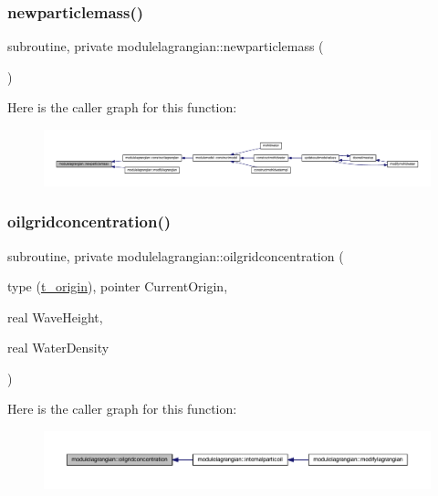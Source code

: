 \subsubsection{\texorpdfstring{newparticlemass()}{newparticlemass()}}
{\footnotesize\ttfamily subroutine, private modulelagrangian\+::newparticlemass (\begin{DoxyParamCaption}{ }\end{DoxyParamCaption})\hspace{0.3cm}{\ttfamily [private]}}

Here is the caller graph for this function\+:\nopagebreak
\begin{figure}[H]
\begin{center}
\leavevmode
\includegraphics[width=350pt]{namespacemodulelagrangian_a5afe5f1c46e068854f5c2eca0de8b0fb_icgraph}
\end{center}
\end{figure}
\mbox{\label{namespacemodulelagrangian_aac3200bb7a0dbdfeccbc61aa00df6387}} 
\subsubsection{\texorpdfstring{oilgridconcentration()}{oilgridconcentration()}}
{\footnotesize\ttfamily subroutine, private modulelagrangian\+::oilgridconcentration (\begin{DoxyParamCaption}\item[{type (\mbox{\hyperlink{structmodulelagrangian_1_1t__origin}{t\+\_\+origin}}), pointer}]{Current\+Origin,  }\item[{real}]{Wave\+Height,  }\item[{real}]{Water\+Density }\end{DoxyParamCaption})\hspace{0.3cm}{\ttfamily [private]}}

Here is the caller graph for this function\+:\nopagebreak
\begin{figure}[H]
\begin{center}
\leavevmode
\includegraphics[width=350pt]{namespacemodulelagrangian_aac3200bb7a0dbdfeccbc61aa00df6387_icgraph}
\end{center}
\end{figure}
\mbox{\label{namespacemodulelagrangian_aa09f0dae86aaba5199991f812e815936}} 
